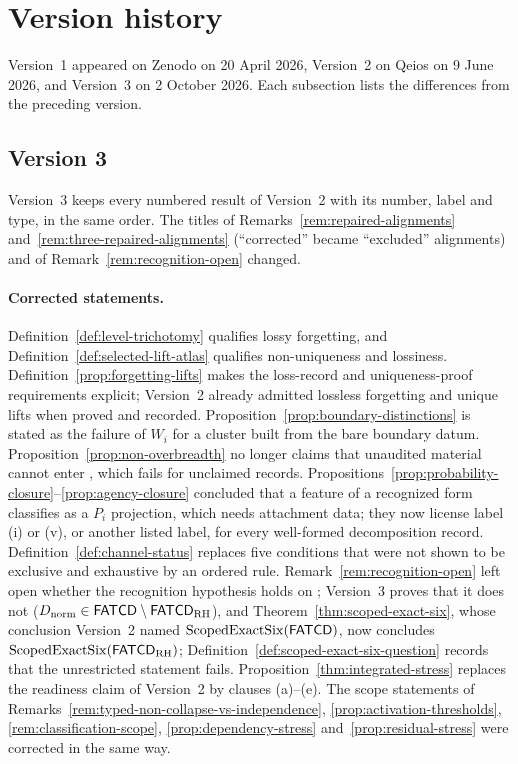 \section{Version history}\label{app:version-history}

Version~1 appeared on Zenodo on 20 April 2026, Version~2 on Qeios on 9 June
2026, and Version~3 on 2 October 2026. Each subsection lists the differences
from the preceding version.

\subsection{Version 3}

Version~3 keeps every numbered result of Version~2 with its number, label and
type, in the same order. The titles of Remarks~\ref{rem:repaired-alignments}
and~\ref{rem:three-repaired-alignments} (``corrected'' became ``excluded''
alignments) and of Remark~\ref{rem:recognition-open} changed.

\paragraph{Corrected statements.} Definition~\ref{def:level-trichotomy}
qualifies lossy forgetting, and Definition~\ref{def:selected-lift-atlas}
qualifies non-uniqueness and lossiness.
Definition~\ref{prop:forgetting-lifts} makes the loss-record and
uniqueness-proof requirements explicit; Version~2 already admitted
lossless forgetting and unique lifts when proved and recorded.
Proposition~\ref{prop:boundary-distinctions} is stated as the failure of
\(W_i\) for a cluster built from the bare boundary datum.
Proposition~\ref{prop:non-overbreadth} no longer claims that unaudited
material cannot enter \FATCD{}, which fails for unclaimed records.
Propositions~\ref{prop:probability-closure}--\ref{prop:agency-closure}
concluded that a feature of a recognized form classifies as a \(P_i\)
projection, which needs attachment data; they now license label (i) or (v),
or another listed label, for every well-formed decomposition record.
Definition~\ref{def:channel-status} replaces five conditions that were not
shown to be exclusive and exhaustive by an ordered rule.
Remark~\ref{rem:recognition-open} left open whether the recognition
hypothesis holds on \FATCD{}; Version~3 proves that it does not
(\(D_{\mathrm{norm}}\in\mathsf{FATCD}\setminus\mathsf{FATCD}_{\mathrm{RH}}\)), and
Theorem~\ref{thm:scoped-exact-six}, whose conclusion Version~2 named
\(\operatorname{ScopedExactSix}(\mathsf{FATCD})\), now concludes
\(\operatorname{ScopedExactSix}(\mathsf{FATCD}_{\mathrm{RH}})\);
Definition~\ref{def:scoped-exact-six-question} records that the unrestricted
statement fails. Proposition~\ref{thm:integrated-stress} replaces the
readiness claim of Version~2 by clauses (a)--(e). The scope statements of
Remarks~\ref{rem:typed-non-collapse-vs-independence},
\ref{prop:activation-thresholds}, \ref{rem:classification-scope},
\ref{prop:dependency-stress} and~\ref{prop:residual-stress} were corrected
in the same way.

